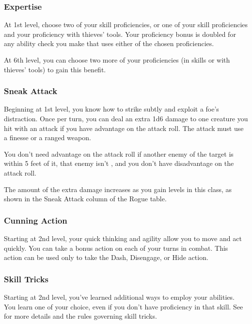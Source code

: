 \subsubsection{Expertise}

At 1st level, choose two of your skill proficiencies, or one of your skill proficiencies and your proficiency with thieves' tools. Your proficiency bonus is doubled for any ability check you make that uses either of the chosen proficiencies.

At 6th level, you can choose two more of your proficiencies (in skills or with thieves' tools) to gain this benefit.

\subsubsection{Sneak Attack}

Beginning at 1st level, you know how to strike subtly and exploit a foe's distraction. Once per turn, you can deal an extra 1d6 damage to one creature you hit with an attack if you have advantage on the attack roll. The attack must use a finesse or a ranged weapon.

You don't need advantage on the attack roll if another enemy of the target is within 5 feet of it, that enemy isn't , and you don't have disadvantage on the attack roll.

The amount of the extra damage increases as you gain levels in this class, as shown in the Sneak Attack column of the Rogue table.

\subsubsection{Cunning Action}

Starting at 2nd level, your quick thinking and agility allow you to move and act quickly. You can take a bonus action on each of your turns in combat. This action can be used only to take the Dash, Disengage, or Hide action.

\subsubsection{Skill Tricks}

Starting at 2nd level, you've learned additional ways to employ your abilities. You learn one  of your choice, even if you don't have proficiency in that skill. See  for more details and the rules governing skill tricks.

